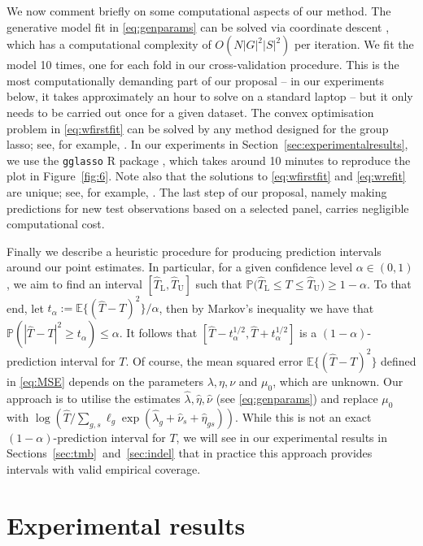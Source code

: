 \documentclass[12pt]{article}
\begin{document}
We now comment briefly on some computational aspects of our method. The generative model fit in \eqref{eq:genparams} can be solved via coordinate descent \citep[see, for example,][]{friedman_regularization_2010}, which has a computational complexity of $O(N|G|^2|S|^2)$ per iteration.  We fit the model 10 times, one for each fold in our cross-validation procedure. This is the most computationally demanding part of our proposal -- in our experiments below, it takes approximately an hour to solve on a standard laptop -- but it only needs to be carried out once for a given dataset.  The convex optimisation problem in \eqref{eq:wfirstfit} can be solved by any method designed for the group \gls{lasso}; see, for example, \citet{yang_fast_2015}. In our experiments in Section~\ref{sec:experimentalresults}, we use the \texttt{gglasso} R package \citep{yang_gglasso_2020}, which takes around 10 minutes to reproduce the plot in Figure~\ref{fig:6}. Note also that the solutions to \eqref{eq:wfirstfit} and \eqref{eq:wrefit} are unique; see, for example, \citet[Theorem~1]{roth_group-lasso_2008}.  The last step of our proposal, namely making predictions for new test observations based on a selected panel, carries negligible computational cost.  

Finally we describe a heuristic procedure for producing prediction intervals around our point estimates.  In particular, for a given confidence level $\alpha \in (0,1)$, we aim to find an interval $[\hat{T}_{\mathrm{L}}, \hat{T}_{\mathrm{U}}]$ such that $\mathbb{P}\bigl(\hat{T}_{\mathrm{L}} \leq T \leq \hat{T}_{\mathrm{U}}\bigr) \geq 1- \alpha.$  To that end, let $t_\alpha := \mathbb{E}\{(\hat{T} - T)^2\}/\alpha$, then by Markov's inequality we have that $\mathbb{P}(|\hat{T} - T|^2 \geq t_\alpha) \leq \alpha$. It follows that $[\hat{T} - t_\alpha^{1/2} , \hat{T}+ t_\alpha^{1/2}]$ is a $(1-\alpha)$-prediction interval for $T$. Of course, the mean squared error $\mathbb{E}\{(\hat{T}-T)^2\}$ defined in \eqref{eq:MSE} depends on the parameters $\lambda, \eta, \nu$ and $\mu_0$, which are unknown.  Our approach is to utilise the estimates $\hat{\lambda}, \hat{\eta}, \hat{\nu}$ (see \eqref{eq:genparams}) and replace $\mu_0$ with $\log(\hat{T}/\sum_{g,s}\ell_g\exp(\hat{\lambda}_g + \hat{\nu}_s + \hat{\eta}_{gs}))$. While this is not an exact $(1-\alpha)$-prediction interval for $T$,  we will see in our experimental results in Sections~\ref{sec:tmb}~and~\ref{sec:indel} that in practice this approach provides intervals with valid empirical coverage.  

\section{Experimental results \label{sec:experimentalresults}}
\end{document}
